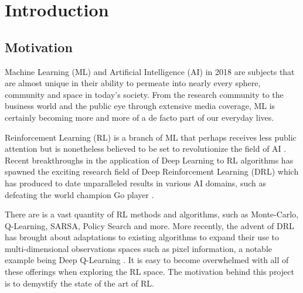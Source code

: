 \chapter{Introduction}

\section{Motivation}
Machine Learning (ML) and Artificial Intelligence (AI) in 2018 are subjects that are almost unique in their ability to permeate into nearly every sphere, community and space in today's society. From the research community to the business world and the public eye through extensive media coverage, ML is certainly becoming more and more of a de facto part of our everyday lives.

Reinforcement Learning (RL) is a branch of ML that perhaps receives less public attention but is nonetheless believed to be set to revolutionize the field of AI \cite{DBLP:journals/corr/abs-1708-05866}. Recent breakthroughs in the application of Deep Learning to RL algorithms has spawned the exciting research field of Deep Reinforcement Learning (DRL) which has produced to date unparalleled results in various AI domains, such as defeating the world champion Go player \cite{44806}.

There are is a vast quantity of RL methods and algorithms, such as Monte-Carlo, Q-Learning, SARSA, Policy Search and more. More recently, the advent of DRL has brought about adaptations to existing algorithms to expand their use to multi-dimensional observations spaces such as pixel information, a notable example being Deep Q-Learning \cite{DBLP:journals/corr/MnihKSGAWR13}. It is easy to become overwhelmed with all of these offerings when exploring the RL space. The motivation behind this project is to demystify the state of the art of RL.

